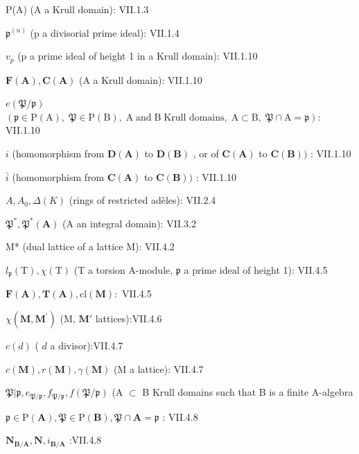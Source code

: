 P(A) (A a Krull domain): VII.1.3

\(\mathfrak{p}^{(n)}\) (p a divisorial prime ideal): VII.1.4

\(v_{p}\) (p a prime ideal of height 1 in a Krull domain): VII.1.10

\(\mathbf{F}(\mathbf{A}), \mathbf{C}(\mathbf{A})\) (A a Krull domain): VII.1.10

\(e(\mathfrak{P}/\mathfrak{p})\) \((\mathfrak{p}\in\mathrm{P}(\mathrm{A}),\;\mathfrak{P}\in\mathrm{P}(\mathrm{B}),\;\mathrm{A}\;\text{and}\;\mathrm{B}\;\text{Krull domains},\;\mathrm{A}\subset\mathrm{B},\;\mathfrak{P}\cap\mathrm{A}=\mathfrak{p}):\) VII.1.10

\(i\) (homomorphism from \(\mathbf{D}(\mathbf{A})\) to \(\mathbf{D}(\mathbf{B})\) , or of \(\mathbf{C}(\mathbf{A})\) to \(\mathbf{C}(\mathbf{B}))\) : VII.1.10

\(\bar{i}\) (homomorphism from \(\mathbf{C}(\mathbf{A})\) to \(\mathbf{C}(\mathbf{B}))\) : VII.1.10

\(A, A_{0}, \Delta(K)\) (rings of restricted adèles): VII.2.4

\(\mathfrak{P}^*, \mathfrak{P}^*(\mathbf{A})\) (A an integral domain): VII.3.2

M* (dual lattice of a lattice M): VII.4.2

\(l_{\mathfrak{p}}(\mathrm{T}), \chi (\mathrm{T})\) (T a torsion A-module, \(\mathfrak{p}\) a prime ideal of height 1): VII.4.5

\(\pmb {F}(\mathbf{A}),\pmb{T}(\mathbf{A}),\mathrm{cl}(\mathbf{M}):\) VII.4.5

\(\chi (\mathbf{M},\mathbf{M}^{\prime})\) (M, \(\mathbf{M}'\) lattices):VII.4.6

\(c(d)\) ( \(d\) a divisor):VII.4.7

\(c(\mathbf{M}), r(\mathbf{M}), \gamma(\mathbf{M})\) (M a lattice): VII.4.7

\(\mathfrak{P}|\mathfrak{p},e_{\mathfrak{P} / \mathfrak{p}},f_{\mathfrak{P} / \mathfrak{p}},f(\mathfrak{P} / \mathfrak{p})\) (A \(\subset\) B Krull domains such that B is a finite A-algebra

\(\mathfrak{p} \in \mathrm{P}(\mathbf{A}), \mathfrak{P} \in \mathrm{P}(\mathbf{B}), \mathfrak{P} \cap \mathbf{A} = \mathfrak{p}\) : VII.4.8

\(\mathbf{N}_{\mathbf{B} / \mathbf{A}},\mathbf{N},i_{\mathbf{B} / \mathbf{A}}\) :VII.4.8


